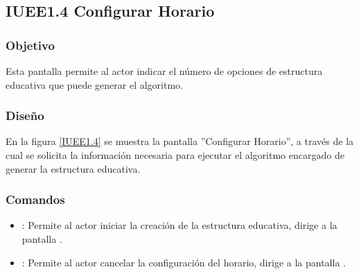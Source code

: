 \subsection{IUEE1.4 Configurar Horario}

\subsubsection{Objetivo}
	Esta pantalla permite al actor indicar el número de opciones de estructura educativa que puede generar el algoritmo.

\subsubsection{Diseño}

	En la figura \ref{IUEE1.4} se muestra la pantalla ''Configurar Horario'', a través de la cual se solicita la información necesaria para ejecutar el algoritmo encargado de generar la estructura educativa.


\subsubsection{Comandos}
\begin{itemize}
	\item {}: Permite al actor iniciar la creación de la estructura educativa, dirige a la pantalla .
	
	\item {}: Permite al actor cancelar la configuración del horario, dirige a la pantalla .
\end{itemize}
